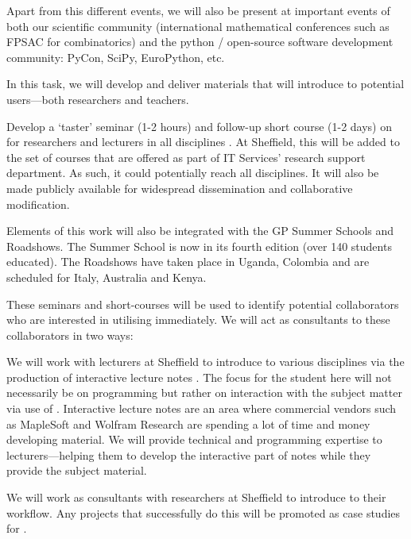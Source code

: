 \begin{workpackage}
\begin{tasklist}
\begin{task}[title=Dissemination: reaching users, lead=PS, id=dissemination]
Apart from this different events, we will also be present at important events of both our scientific community (international mathematical conferences such as FPSAC for combinatorics) and the python / open-source software development community: PyCon, SciPy, EuroPython, etc.


\end{task}


\begin{task}[title=Introduce \TheProject to researchers and teachers, id=project-intro,lead=USH,PM=6]

In this task, we will develop and deliver materials that will
introduce \TheProject to potential users---both researchers and
teachers.

Develop a `taster' seminar (1-2 hours) and follow-up short course (1-2
days) on \TheProject for researchers and lecturers in all disciplines
. At Sheffield, this will be added to
the set of courses that are offered as part of IT Services' research
support department. As such, it could potentially reach all
disciplines. It will also be made publicly available for widespread
dissemination and collaborative modification.

Elements of this work will also be integrated with the GP Summer
Schools and Roadshows. The Summer School is now in its fourth edition
(over 140 students educated). The Roadshows have taken place in
Uganda, Colombia and are scheduled for Italy, Australia and Kenya.

These seminars and short-courses will be used to identify potential
collaborators who are interested in utilising \TheProject
immediately. We will act as consultants to these collaborators in two
ways:

We will work with lecturers at Sheffield to introduce \TheProject to
various disciplines via the production of interactive lecture
notes . The focus for the student here will not necessarily be on
programming but rather on interaction with the subject matter via use
of \TheProject. Interactive lecture notes are an area where commercial
vendors such as MapleSoft and Wolfram Research are spending a lot of
time and money developing material. We will provide technical and
programming expertise to lecturers---helping them to develop the
interactive part of notes while they provide the subject material.

We will work as consultants with researchers at Sheffield to introduce
\TheProject to their workflow. Any projects that successfully do this
will be promoted as case studies for \TheProject.
\end{task}


\end{tasklist}
\end{workpackage}
